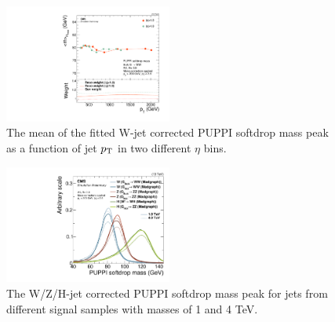 \begin{figure}[htbp]
\centering
\includegraphics[width=0.49\textwidth]{figures/analysis/search2/AN-16-235/plots/ClosureTest_RecoMass.pdf}
\caption{The mean of the fitted W-jet corrected PUPPI softdrop mass peak as a function of jet $p_{\mathrm{T}}$ in two different $\eta$ bins.}
\label{fig:searchII:wtagclosure}
\end{figure}
\begin{figure}[htbp]
\centering
\includegraphics[width=0.49\textwidth]{figures/analysis/search2/AN-16-235/plots/SoftdropMass_NEWCORR_wH0.pdf}
\caption{The W/Z/H-jet corrected PUPPI softdrop mass peak for jets from different signal samples with masses of 1 and 4 TeV.}
\label{fig:search2:corrMass}
\end{figure}

